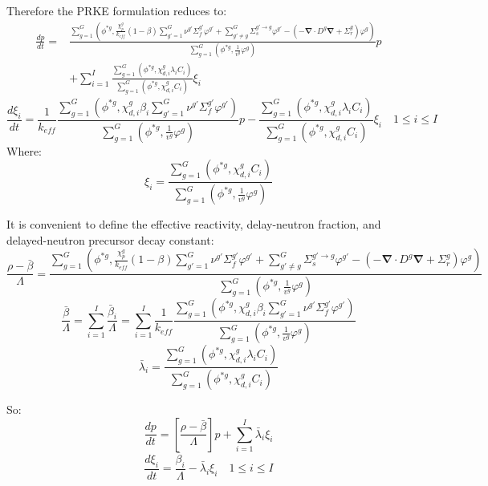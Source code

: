 \documentclass[10pt]{scrartcl}
\renewcommand{\div}{\bs{\nabla}\! \cdot \!}
\newcommand{\grad}{\bs{\nabla}}
\newcommand{\bs}[1]{\mathbf{#1}}
\newcommand{\be}{\begin{equation}}
\newcommand{\ee}{\end{equation}}
\begin{document}
Therefore the PRKE formulation reduces to:
\begin{align}
\frac{dp}{dt}= &\frac{\sum_{g=1}^G\left(\phi^{*g},\frac{\chi_p^g}{k_{eff}}(1-\beta) \sum_{g'=1}^G  \nu^{g'} \Sigma_f^{g'} \varphi^{g'} + \sum_{g'\neq g}^G\Sigma_s^{g'\to g}  \varphi^{g'} - \left( -\div D^g \grad  + \Sigma_r^g \right) \varphi^g\right)}{\sum_{g=1}^G\left(\phi^{*g},\frac{1}{v^g}\varphi^g\right)}p \nonumber \\ 
& +\sum_{i=1}^I\frac{\sum_{g=1}^G(\phi^{*g},\chi_{d,i}^g\lambda_i C_i)}{\sum_{g=1}^G(\phi^{*g},\chi_{d,i}^gC_i)}\xi_i
\end{align}
\be
\frac{d\xi_i}{dt}=\frac{1}{k_{eff}}\frac{\sum_{g=1}^G(\phi^{*g},\chi_{d,i}^g\beta_i\sum_{g'=1}^G\nu^{g'} \Sigma_f^{g' }\varphi^{g'})}{\sum_{g=1}^G\left(\phi^{*g},\frac{1}{v^g}\varphi^g\right)}p - \frac{\sum_{g=1}^G(\phi^{*g},\chi_{d,i}^g\lambda_iC_i)}{\sum_{g=1}^G(\phi^{*g},\chi_{d,i}^gC_i)}\xi_i \quad 1 \le i \le I 
\ee
Where:
\be
\xi_i=\frac{\sum_{g=1}^G(\phi^{*g},\chi_{d,i}^g C_i)}{\sum_{g=1}^G\left(\phi^{*g},\frac{1}{v^g}\varphi^g\right)}
\ee

It is convenient to define the effective reactivity, delay-neutron fraction, and delayed-neutron precursor decay constant:
\be
\frac{\rho-\bar{\beta}}{\Lambda}=\frac{ \sum_{g=1}^G\left(\phi^{*g},\frac{\chi_p^g}{k_{eff}}(1-\beta)\sum_{g'=1}^G \nu^{g'} \Sigma_f^{g'}\varphi^{g'} + \sum_{g'\neq g}^G\Sigma_s^{g'\to g} \varphi^{g'} -\left( -\div D^g \grad  + \Sigma_r^g \right)\varphi^g\right)}{\sum_{g=1}^G\left(\phi^{*g},\frac{1}{v^g}\varphi^g\right)}
\label{eq:rmb}
\ee
\be
\frac{\bar{\beta}}{\Lambda}=\sum_{i=1}^I\frac{\bar{\beta}_i}{\Lambda}=\sum_{i=1}^I\frac{1}{k_{eff}}\frac{\sum_{g=1}^G(\phi^{*g}, \chi_{d,i}^g\beta_i\sum_{g'=1}^G\nu^{g'} \Sigma_f^{g' }\varphi^{g'})}{\sum_{g=1}^G\left(\phi^{*g},\frac{1}{v^g}\varphi^g\right)}
\label{eq:b}
\ee
\be
\bar{\lambda}_i=\frac{\sum_{g=1}^G(\phi^{*g},\chi_{d,i}^g\lambda_i C_i)}{\sum_{g=1}^G(\phi^{*g},\chi_{d,i}^gC_i)}
\label{eq:l}
\ee

So:
\be
\frac{dp}{dt}=\left[\frac{\rho-\bar{\beta}}{\Lambda}\right]p+\sum_{i=1}^I\bar{\lambda}_i\xi_i
\label{eq:p}
\ee
\be
\frac{d\xi_i}{dt}=\frac{\bar{\beta}_i}{\Lambda}-\bar{\lambda}_i\xi_i \quad 1 \le i \le I 
\label{eq:c}
\ee
\end{document}
